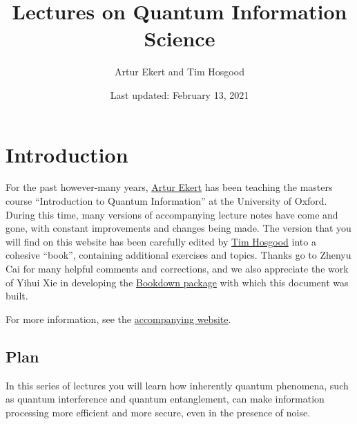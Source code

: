 \documentclass[fleqn]{article}
\title{Lectures on Quantum Information Science}
\author{Artur Ekert and Tim Hosgood}
\date{Last updated: February 13, 2021}
\renewcommand{\leq}{\leqslant}
\renewcommand{\geq}{\geqslant}
\let\oldsection\section
\renewcommand\section{\clearpage\oldsection}
\begin{document}
\setcounter{tocdepth}{2}
\tableofcontents

\providecommand{\xmapsto}[1]{\overset{#1}{\longmapsto}}
\providecommand{\bra}[1]{\langle#1|}
\providecommand{\ket}[1]{|#1\rangle}
\providecommand{\braket}[2]{\langle#1|#2\rangle}
\providecommand{\proj}[1]{|#1\rangle\langle#1|}
\providecommand{\av}[1]{\langle#1\rangle}
\providecommand{\tr}{\operatorname{tr}}
\providecommand{\id}{\mathbf{1}}
\providecommand{\diag}[2]{\begin{bmatrix}#1&0\\0&#2\end{bmatrix}}
\providecommand{\mqty}[1]{\begin{matrix}#1\end{matrix}}
\providecommand{\bmqty}[1]{\begin{bmatrix}#1\end{bmatrix}}
\renewcommand{\leq}{\leqslant}
\renewcommand{\geq}{\geqslant}

\hypertarget{introduction}{%
\section*{Introduction}\label{introduction}}

For the past however-many years, \href{https://www.arturekert.com/}{Artur Ekert} has been teaching the masters course ``Introduction to Quantum Information'' at the University of Oxford.
During this time, many versions of accompanying lecture notes have come and gone, with constant improvements and changes being made.
The version that you will find on this website has been carefully edited by \href{https://thosgood.com}{Tim Hosgood} into a cohesive ``book'', containing additional exercises and topics.
Thanks go to Zhenyu Cai for many helpful comments and corrections, and we also appreciate the work of Yihui Xie in developing the \href{https://bookdown.org/yihui/bookdown/}{Bookdown package} with which this document was built.

For more information, see the \href{https://thosgood.com/quantum-info}{accompanying website}.

\hypertarget{plan}{%
\subsection*{Plan}\label{plan}}

In this series of lectures you will learn how inherently quantum phenomena, such as quantum interference and quantum entanglement, can make information processing more efficient and more secure, even in the presence of noise.
\end{document}
